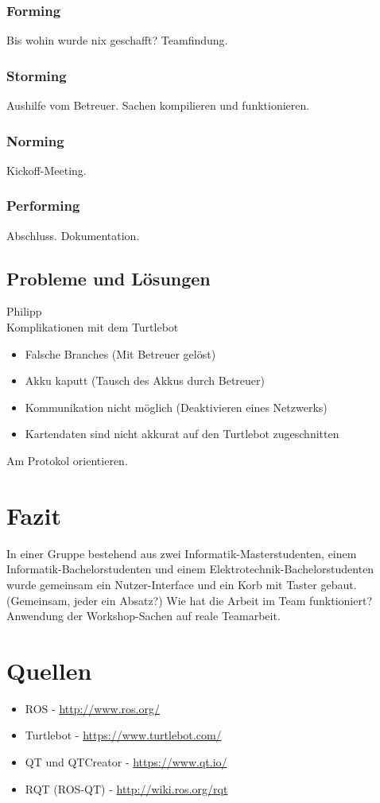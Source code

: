 \documentclass[a4paper,12pt,headsepline]{scrartcl}
\begin{document}
	\subsubsection{Forming}
		Bis wohin wurde nix geschafft? Teamfindung.
	\subsubsection{Storming}
		Aushilfe vom Betreuer. Sachen kompilieren und funktionieren.
	\subsubsection{Norming}
		Kickoff-Meeting. 
	\subsubsection{Performing}
		Abschluss. Dokumentation.
	\subsection{Probleme und Lösungen}
		Philipp\\
		Komplikationen mit dem Turtlebot
		\begin{itemize}
			\item Falsche Branches (Mit Betreuer gelöst)
			\item Akku kaputt (Tausch des Akkus durch Betreuer)
			\item Kommunikation nicht möglich (Deaktivieren eines Netzwerks)
			\item Kartendaten sind nicht akkurat auf den Turtlebot zugeschnitten
		\end{itemize}
		Am Protokol orientieren.
	\section{Fazit}
		In einer Gruppe bestehend aus zwei Informatik-Masterstudenten, einem Informatik-Bachelorstudenten und einem Elektrotechnik-Bachelorstudenten wurde gemeinsam ein Nutzer-Interface und ein Korb mit Taster gebaut.\\
		(Gemeinsam, jeder ein Absatz?)
		Wie hat die Arbeit im Team funktioniert? Anwendung der Workshop-Sachen auf reale Teamarbeit.
		
	\newpage
	\section{Quellen}
		\begin{itemize}
			\item ROS - \href{http://www.ros.org/}{http://www.ros.org/}
			\item Turtlebot - \href{https://www.turtlebot.com/}{https://www.turtlebot.com/}
			\item QT und QTCreator - \href{https://www.qt.io/}{https://www.qt.io/}
			\item RQT (ROS-QT) - \href{http://wiki.ros.org/rqt}{http://wiki.ros.org/rqt}
		\end{itemize}
\end{document}
